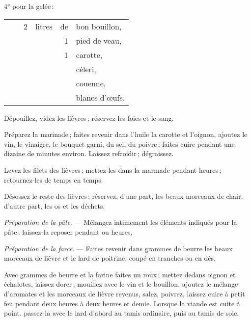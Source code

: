 4° pour la gelée :

\footnotesize
\begin{longtable}{rrrrrp{18em}}
  & \hspace{2em} &    2 & litres & de & bon bouillon,                                                     \\
  & \hspace{2em} &      &        &  1 & pied de veau,                                                     \\
  & \hspace{2em} &      &        &  1 & carotte,                                                          \\
  & \hspace{2em} &      &        &    & céleri,                                                           \\
  & \hspace{2em} &      &        &    & couenne,                                                          \\
  & \hspace{2em} &      &        &    & blancs d'œufs.                                                    \\
\end{longtable}
\normalsize

Dépouillez, videz les lièvres ; réservez les foies et le sang.

Préparez la marinade ; faites revenir dans l'huile la carotte et l'oignon, ajoutez
le vin, le vinaigre, le bouquet garni, du sel, du poivre ; faites cuire pendant une
dizaine de minutes environ. Laissez refroidir ; dégraissez.

Levez les filets des lièvres ; mettez-les dans la marmade pendant {\mmm} heures ;
retournez-les de temps en temps.

Désossez le reste des lièvres ; réservez, d'une part, les beaux morceaux de
chair, d'autre part, les os et les déchets.

\medskip

\textit{Préparation de la pâte}. — Mélangez intimement les éléments indiqués
pour la pâte : laissez-la reposer pendant {\mmm} ou {\mmm} heures,

\medskip

\textit{Préparation de la farce}. — Faites revenir dans {\mmm} grammes de
beurre les beaux morceaux de lièvre et le lard de poitrine, coupé en tranches
ou en dés.

Avec {\mmm} grammes de beurre et la farine faites un roux ; mettez dedans
oignon et échalotes, laissez dorer ; mouillez avec le vin et le bouillon,
ajoutez le mélange d'aromates et les morceaux de lièvre revenus, salez,
poivrez, laissez cuire à petit feu pendant deux heures à deux heures et demie.
Lorsque la viande est cuite à point. passez-la avec le lard d'abord au tamis
ordinaire, puis au tamis de soie.

